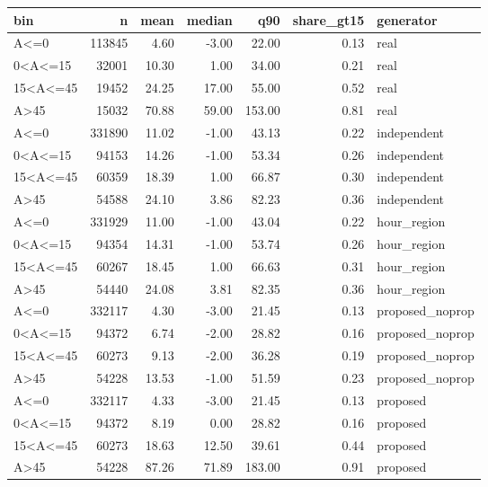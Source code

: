 \begin{tabular}{lrrrrrl}
\toprule
bin & n & mean & median & q90 & share\_gt15 & generator \\
\midrule
A<=0 & 113845 & 4.60 & -3.00 & 22.00 & 0.13 & real \\
0<A<=15 & 32001 & 10.30 & 1.00 & 34.00 & 0.21 & real \\
15<A<=45 & 19452 & 24.25 & 17.00 & 55.00 & 0.52 & real \\
A>45 & 15032 & 70.88 & 59.00 & 153.00 & 0.81 & real \\
A<=0 & 331890 & 11.02 & -1.00 & 43.13 & 0.22 & independent \\
0<A<=15 & 94153 & 14.26 & -1.00 & 53.34 & 0.26 & independent \\
15<A<=45 & 60359 & 18.39 & 1.00 & 66.87 & 0.30 & independent \\
A>45 & 54588 & 24.10 & 3.86 & 82.23 & 0.36 & independent \\
A<=0 & 331929 & 11.00 & -1.00 & 43.04 & 0.22 & hour\_region \\
0<A<=15 & 94354 & 14.31 & -1.00 & 53.74 & 0.26 & hour\_region \\
15<A<=45 & 60267 & 18.45 & 1.00 & 66.63 & 0.31 & hour\_region \\
A>45 & 54440 & 24.08 & 3.81 & 82.35 & 0.36 & hour\_region \\
A<=0 & 332117 & 4.30 & -3.00 & 21.45 & 0.13 & proposed\_noprop \\
0<A<=15 & 94372 & 6.74 & -2.00 & 28.82 & 0.16 & proposed\_noprop \\
15<A<=45 & 60273 & 9.13 & -2.00 & 36.28 & 0.19 & proposed\_noprop \\
A>45 & 54228 & 13.53 & -1.00 & 51.59 & 0.23 & proposed\_noprop \\
A<=0 & 332117 & 4.33 & -3.00 & 21.45 & 0.13 & proposed \\
0<A<=15 & 94372 & 8.19 & 0.00 & 28.82 & 0.16 & proposed \\
15<A<=45 & 60273 & 18.63 & 12.50 & 39.61 & 0.44 & proposed \\
A>45 & 54228 & 87.26 & 71.89 & 183.00 & 0.91 & proposed \\
\bottomrule
\end{tabular}
